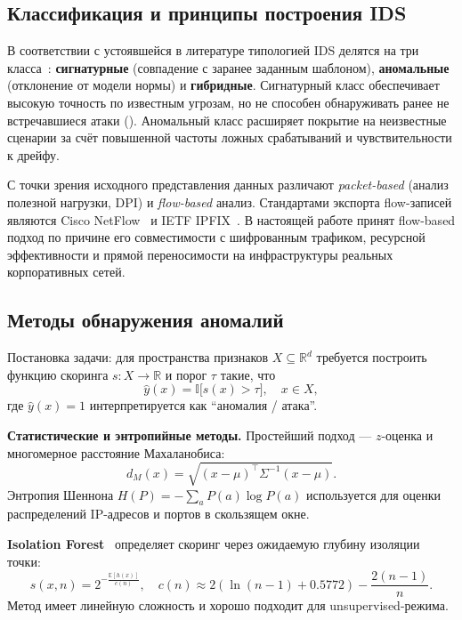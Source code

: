 \subsection{Классификация и принципы построения IDS}

В соответствии с устоявшейся в литературе типологией IDS делятся на
три класса~\cite{khraisat2019survey, ahmad2021nids, ferrag2020dlcyber}:
\textbf{сигнатурные} (совпадение с заранее заданным шаблоном),
\textbf{аномальные} (отклонение от модели нормы) и \textbf{гибридные}.
Сигнатурный класс обеспечивает высокую точность по известным угрозам,
но не способен обнаруживать ранее не встречавшиеся атаки ().
Аномальный класс расширяет покрытие на неизвестные сценарии за счёт
повышенной частоты ложных срабатываний и чувствительности к дрейфу.

С точки зрения исходного представления данных различают \emph{packet-based}
(анализ полезной нагрузки, DPI) и \emph{flow-based} анализ.
Стандартами экспорта flow-записей являются Cisco NetFlow~\cite{rfc3954} и
IETF IPFIX~\cite{rfc7011}. В настоящей работе принят flow-based подход
по причине его совместимости с шифрованным трафиком, ресурсной
эффективности и прямой переносимости на инфраструктуры реальных
корпоративных сетей.

\subsection{Методы обнаружения аномалий}

Постановка задачи: для пространства признаков \(X \subseteq \mathbb{R}^d\)
требуется построить функцию скоринга \(s\colon X \to \mathbb{R}\) и
порог \(\tau\) такие, что
\begin{equation}
\hat{y}(x) = \mathbb{I}\bigl[s(x) > \tau\bigr],
\quad x \in X,
\label{eq:detector}
\end{equation}
где \(\hat{y}(x) = 1\) интерпретируется как ``аномалия / атака''.

\textbf{Статистические и энтропийные методы.} Простейший подход ---
\(z\)-оценка и многомерное расстояние Махаланобиса:
\begin{equation}
d_M(x) = \sqrt{(x-\mu)^{\top}\Sigma^{-1}(x-\mu)}.
\label{eq:mahalanobis}
\end{equation}
Энтропия Шеннона \(H(P) = -\sum_a P(a)\log P(a)\) используется для
оценки распределений IP-адресов и портов в скользящем окне.

\textbf{Isolation Forest}~\cite{liu2008isolation} определяет
скоринг через ожидаемую глубину изоляции точки:
\begin{equation}
s(x, n) = 2^{-\frac{\mathbb{E}[h(x)]}{c(n)}},\quad
c(n) \approx 2(\ln(n-1) + 0.5772) - \frac{2(n-1)}{n}.
\label{eq:iforest}
\end{equation}
Метод имеет линейную сложность и хорошо подходит для unsupervised-режима.

